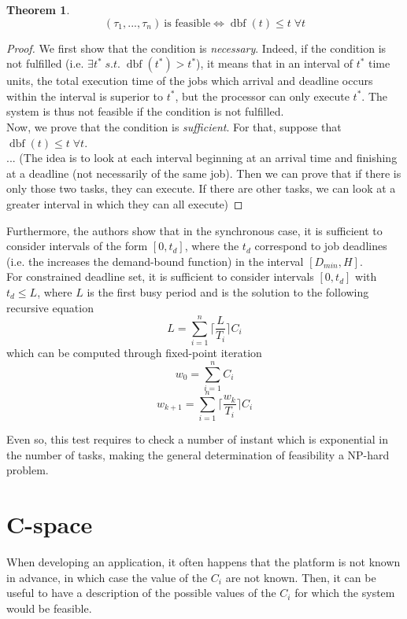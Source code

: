 \documentclass[a4paper,10pt]{article}
\newcommand{\dbf}[1]{\operatorname{dbf}(#1)}
\newtheorem{theorem}{Theorem}
\begin{document}
\begin{theorem}
\[
	(\tau_1, ..., \tau_n) \: \text{is feasible} \iff \dbf{t} \leq t \; \forall t
\]
\end{theorem}

\begin{proof}
	We first show that the condition is \emph{necessary}. Indeed, if the condition
	is not fulfilled (i.e. $\exists t^* \; s.t. \; \dbf{t^*} > t^*$), it means that
	in an interval of $t^*$ time units, the total execution time of the jobs which
	arrival and deadline occurs within the interval is superior to $t^*$, but the
	processor can only execute $t^*$. The system is thus not feasible if the
	condition is not fulfilled.\\

	Now, we prove that the condition is \emph{sufficient}. For that, suppose that $\dbf{t} \leq t \; \forall t$.\\

	... (The idea is to look at each interval beginning at an arrival time and
	finishing at a deadline (not necessarily of the same job). Then we can prove
	that if there is only those two tasks, they can execute. If there are other
	tasks, we can look at a greater interval in which they can all execute)

\end{proof}

Furthermore, the authors show that in the synchronous case, it is sufficient to consider intervals of the form $[0, t_d]$, where the $t_d$ correspond to job deadlines (i.e. the increases the demand-bound function) in the interval $\left[ D_{min}, H \right]$.\\

For constrained deadline set, it is sufficient to consider intervals $[0, t_d]$ with $t_d \leq L$, where $L$ is the first busy period and is the solution to the following recursive equation $$L = \sum_{i=1}^{n} \lceil \frac{L}{T_i} \rceil C_i$$ which can be computed through fixed-point iteration $$w_0 = \sum_{i=1}^{n} C_i$$ $$w_{k+1} = \sum_{i=1}^{n} \lceil \frac{w_k}{T_i} \rceil C_i$$

Even so, this test requires to check a number of instant which is exponential in the number of tasks, making the general determination of feasibility a NP-hard problem.

\section{C-space}
When developing an application, it often happens that the platform is not known in advance, in which case the value of the $C_i$ are not known. Then, it can be useful to have a description of the possible values of the $C_i$ for which the system would be feasible.
\end{document}
